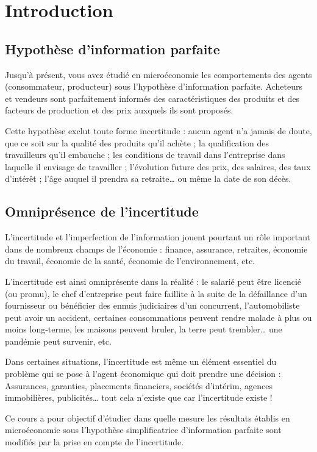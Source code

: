 \documentclass[a4paper, 12pt]{report}
\begin{document}
	
	\chapter*{Introduction}
	
\section{Hypothèse d'information parfaite}

Jusqu'à présent, vous avez étudié en microéconomie les comportements des agents (consommateur, producteur) sous l'hypothèse d'information parfaite. Acheteurs et vendeurs sont parfaitement informés des caractéristiques des produits et des facteurs de production et des prix auxquels ils sont proposés. 

Cette hypothèse exclut toute forme incertitude : aucun agent n'a jamais de doute, que ce soit sur la qualité des produits qu'il achète ; la qualification des travailleurs qu'il
embauche ; les conditions de travail dans l'entreprise dans laquelle il envisage de travailler ; l'évolution future des prix, des salaires, des taux d'intérêt ; l'âge auquel il prendra sa retraite… ou même la date de son décès. 

\section{Omniprésence de l'incertitude}

L'incertitude et l'imperfection de l'information jouent pourtant un rôle important dans de nombreux champs de l’économie : finance, assurance, retraites, économie du travail, économie de la santé, économie de l’environnement, etc.

L'incertitude est ainsi omniprésente dans la réalité : le salarié peut être licencié (ou promu), le chef d'entreprise peut faire faillite à la suite de la défaillance d'un fournisseur ou bénéficier des ennuis judiciaires d'un concurrent, l'automobiliste peut avoir un accident, certaines consommations peuvent rendre malade à plus ou moins long-terme, les maisons peuvent bruler, la terre peut trembler… une pandémie peut survenir, etc.

Dans certaines situations, l'incertitude est même un élément essentiel du problème qui se pose à l'agent économique qui doit prendre une décision : Assurances, garanties, placements financiers, sociétés d'intérim, agences immobilières, publicités… tout cela n'existe que car l'incertitude existe !

Ce cours a pour objectif d’étudier dans quelle mesure les résultats établis en microéconomie sous l'hypothèse simplificatrice d’information parfaite sont modifiés par la prise en compte de l'incertitude.
\end{document}
